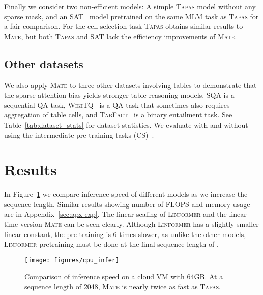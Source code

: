 \documentclass[11pt]{article}
\newcommand\sqa{\textsc{SQA}\xspace}
\newcommand\tabfact{\textsc{TabFact}\xspace}
\newcommand\wtq{\textsc{WikiTQ}\xspace}
\newcommand{\tapas}{\textsc{Tapas}\xspace}
\newcommand{\linformer}{\textsc{Linformer}\xspace}
\newcommand{\sat}{\textsc{SAT}\xspace}
\newcommand{\model}{\textsc{Mate}\xspace}
\begin{document}
Finally we consider two non-efficient models: A simple \tapas model without any sparse mask, and an \sat~\cite{zhang-etal-2020-table} model pretrained on the same MLM task as \tapas for a fair comparison. For the cell selection task \tapas obtains similar results to \model, but both \tapas and \sat lack the efficiency improvements of \model.  
\subsection{Other datasets}

We also apply \model to three other datasets involving tables to demonstrate that the sparse attention bias yields stronger table reasoning models.
\sqa \cite{iyyer-etal-2017-search} is a sequential QA task, \wtq~\cite{pasupat2015compositional} is a QA task that sometimes also requires aggregation of table cells, and \tabfact~\cite{Chen2020TabFact} is a binary entailment task. See Table~\ref{tab:dataset_stats} for dataset statistics. 
We evaluate with and without using the intermediate pre-training tasks (CS)~\cite{eisenschlos-etal-2020-understanding}. \section{Results}
\label{sec:results}

In Figure~\ref{fig:speed} we compare inference speed of different models as we increase the sequence length. 
Similar results showing number of FLOPS and memory usage are in Appendix~\ref{sec:apx-exp}.
The linear scaling of \linformer and the linear-time version \model can be seen clearly.
Although \linformer has a slightly smaller linear constant, the pre-training is 6 times slower, as unlike the other models, \linformer pretraining must be done at the final sequence length of .

\begin{figure}
    \centering
    \texttt{[image: figures/cpu\_infer]}
    \caption{Comparison of inference speed on a cloud VM with 64GB. At a sequence length of 2048, \model is nearly twice as fast as \tapas.}
    \label{fig:speed}
\end{figure}
\end{document}
